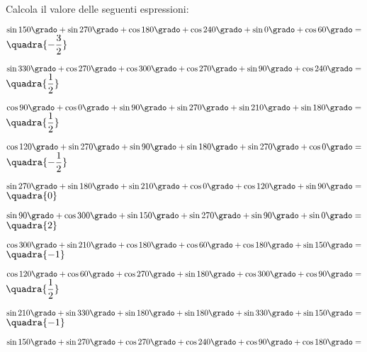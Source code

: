 \subsubsection*{}

\begin{esercizio}\label{ese:}
 Calcola il valore delle seguenti espressioni:
 \begin{enumeratea}
  \item  $\sin 150 \grado+ \sin 270 \grado+ \cos 180 \grado+ 
          \cos 240 \grado+ \sin 0 \grado+ \cos 60 \grado= $
   \hfill $\quadra{-\dfrac{3}{2}}$
  \item  $\sin 330 \grado+ \cos 270 \grado+ \cos 300 \grado+ 
          \cos 270 \grado+ \sin 90 \grado+ \cos 240 \grado= $
   \hfill $\quadra{\dfrac{1}{2}}$
  \item  $\cos 90 \grado + \cos 0 \grado + \sin 90 \grado + 
          \sin 270 \grado + \sin 210 \grado + \sin 180 \grado = $
   \hfill $\quadra{\dfrac{1}{2}}$
  \item  $\cos 120 \grado + \sin 270 \grado + \sin 90 \grado + 
          \sin 180 \grado + \sin 270 \grado + \cos 0 \grado = $
   \hfill $\quadra{-\dfrac{1}{2}}$
  \item  $\sin 270 \grado + \sin 180 \grado + \sin 210 \grado + 
          \cos 0 \grado + \cos 120 \grado + \sin 90 \grado = $
   \hfill $\quadra{0}$
  \item  $\sin 90 \grado + \cos 300 \grado + \sin 150 \grado + 
          \sin 270 \grado + \sin 90 \grado + \sin 0 \grado = $
   \hfill $\quadra{2}$
  \item  $\cos 300 \grado + \sin 210 \grado + \cos 180 \grado + 
          \cos 60 \grado + \cos 180 \grado + \sin 150 \grado = $
   \hfill $\quadra{-1}$
  \item  $\cos 120 \grado + \cos 60 \grado + \cos 270 \grado + 
          \sin 180 \grado + \cos 300 \grado + \cos 90 \grado = $
   \hfill $\quadra{\dfrac{1}{2}}$
  \item  $\sin 210 \grado + \sin 330 \grado + \sin 180 \grado + 
          \sin 180 \grado + \sin 330 \grado + \sin 150 \grado = $
   \hfill $\quadra{-1}$
  \item  $\sin 150 \grado + \sin 270 \grado + \cos 270 \grado + 
          \cos 240 \grado + \cos 90 \grado + \cos 180 \grado = $

\end{enumeratea}
\end{esercizio}
